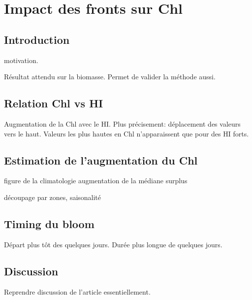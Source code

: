 
\chapter{Impact des fronts sur Chl}

\section{Introduction}

motivation.

Résultat attendu sur la biomasse.
Permet de valider la méthode aussi.

\section{Relation Chl vs HI}

Augmentation de la Chl avec le HI.
Plus précisement: déplacement des valeurs vers le haut.
Valeurs les plus hautes en Chl n'apparaissent que pour des HI forts.

\section{Estimation de l'augmentation du Chl}

figure de la climatologie
augmentation de la médiane
surplus

découpage par zones, saisonalité

\section{Timing du bloom}

Départ plus tôt des quelques jours.
Durée plus longue de quelques jours.

\section{Discussion}

Reprendre discussion de l'article essentiellement.
